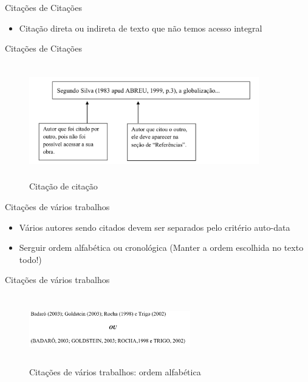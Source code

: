\begin{frame}	
	\begin{block}{Citações de Citações}	
		\begin{itemize}
			\item Citação direta ou indireta de texto que não temos acesso integral
		\end{itemize}
	\end{block}
\end{frame}

\begin{frame}	
	\begin{block}{Citações de Citações}	
		 \begin{figure}[!htb]
			\centering	  				
			\includegraphics[height=5cm, width = 10cm]{./pic/apud.png}
			\caption{Citação de citação}
			\author{Guia de formatação SENAC }
			\label{fig_citacaodecitacao}
		\end{figure}
	\end{block}
\end{frame}

\begin{frame}	
	\begin{block}{Citações de vários trabalhos}	
		\begin{itemize}
			\item Vários autores sendo citados devem ser separados pelo critério auto-data
			\item Serguir ordem alfabética ou cronológica (Manter a ordem escolhida no texto todo!)
		\end{itemize}
	\end{block}
\end{frame}

\begin{frame}	
	\begin{block}{Citações de vários trabalhos}	
		 \begin{figure}[!htb]
			\centering	  				
			\includegraphics[height=3cm, width = 7cm]{./pic/alfabetica.png}
			\caption{Citações de vários trabalhos: ordem alfabética}
			\author{Guia de formatação SENAC }
			\label{fig_citacaodecitacao}
		\end{figure}
	\end{block}
	
\end{frame}

